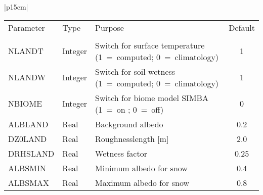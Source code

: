 \begin{center}
\begin{tabular}{|p{15cm}|}
 \vspace{1mm} 

\begin{center}
\begin{tabular}{l l p{5cm} c} %
Parameter & Type & Purpose & Default \\
&&&\\
NLANDT & Integer & Switch for surface temperature (1~=~computed; 0~=~climatology) &
1 \\
NLANDW & Integer & Switch for soil wetness (1~=~computed; 0~=~climatology) & 1 \\
NBIOME & Integer & Switch for biome model SIMBA (1~=~on ; 0~=~off) & 0 \\
ALBLAND & Real & Background albedo & 0.2 \\
DZ0LAND & Real & Roughnesslength [m]& 2.0 \\
DRHSLAND & Real & Wetness factor & 0.25 \\
ALBSMIN & Real& Minimum albedo for snow & 0.4 \\
ALBSMAX & Real& Maximum albedo for snow & 0.8
\end{tabular}
\end{center}
\vspace{3mm} \\
\hline
\end{tabular}
\end{center}

\newpage 

